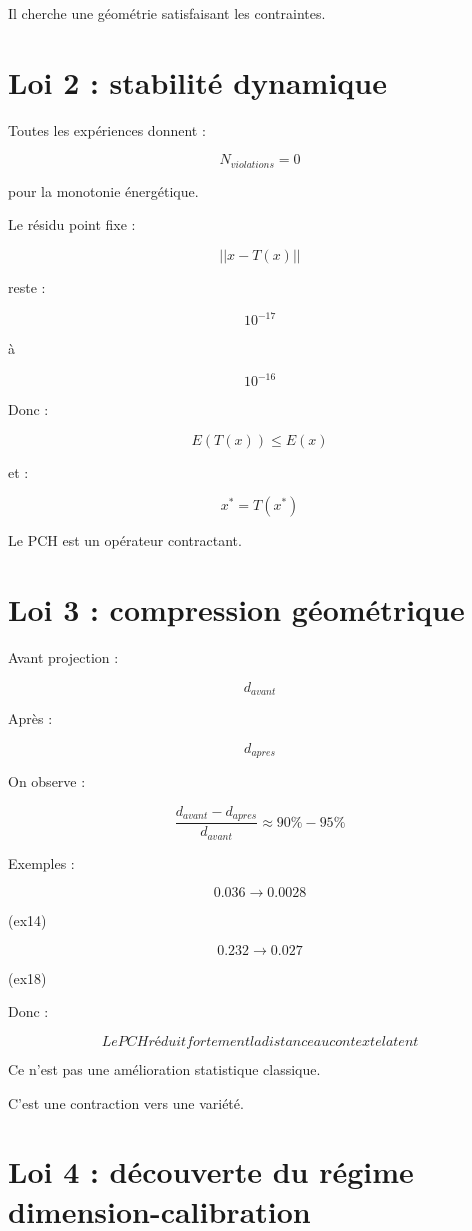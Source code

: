 \documentclass{article}
\begin{document}
Il cherche une géométrie satisfaisant les contraintes.


\section{Loi 2 : stabilité dynamique}

Toutes les expériences donnent :

\[
N_{violations}=0
\]

pour la monotonie énergétique.


Le résidu point fixe :

\[
||x-T(x)||
\]

reste :

\[
10^{-17}
\]

à

\[
10^{-16}
\]


Donc :

\[
E(T(x))\leq E(x)
\]


et :

\[
x^*=T(x^*)
\]


Le PCH est un opérateur contractant.


\section{Loi 3 : compression géométrique}

Avant projection :

\[
d_{avant}
\]

Après :

\[
d_{apres}
\]


On observe :

\[
\frac{d_{avant}-d_{apres}}
{d_{avant}}
\approx90\%-95\%
\]


Exemples :

\[
0.036\rightarrow0.0028
\]

(ex14)

\[
0.232\rightarrow0.027
\]

(ex18)


Donc :

\[
\boxed{
Le PCH réduit fortement la distance au contexte latent
}
\]


Ce n'est pas une amélioration statistique classique.

C'est une contraction vers une variété.


\section{Loi 4 : découverte du régime dimension-calibration}
\end{document}
